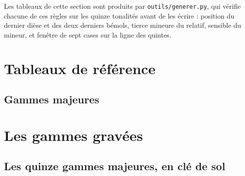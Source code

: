 \documentclass[a4paper,11pt]{article}
\begin{document}
\begin{remarque}
Les tableaux de cette section sont produits par \texttt{outils/generer.py},
qui vérifie chacune de ces règles sur les quinze tonalités avant de les
écrire : position du dernier dièse et des deux derniers bémols, tierce mineure
du relatif, sensible du mineur, et fenêtre de sept cases sur la ligne des
quintes.
\end{remarque}

\clearpage
\section{Tableaux de référence}
\label{sec:reference}

\subsection{Gammes majeures}



%
%
\clearpage
\section{Les gammes gravées}
\label{sec:gravees}

\subsection{Les quinze gammes majeures, en clé de sol}
\begin{samepage}

\end{samepage}
\end{document}
